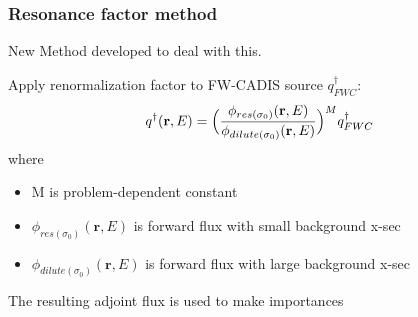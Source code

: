 \documentclass[xcolor=x11names,compress, handout]{beamer}
\renewcommand{\(}{\begin{columns}}
\renewcommand{\)}{\end{columns}}
\newcommand{\<}[1]{\begin{column}{#1}}
\renewcommand{\>}{\end{column}}
\newcommand{\ve}[1]{\ensuremath{\mathbf{#1}}}
\newcommand{\micro}{\ensuremath{\sigma}}
\begin{document}
\begin{frame}[fragile]
  \frametitle{Resonance factor method \cite{Wilson2015}}
  
  \alert{New Method} developed to deal with this. 
  \vspace{0.5 em}
  
  	Apply renormalization factor to FW-CADIS source $q^{\dagger}_{FWC}$: 
	\begin{equation}
   	q^{\dagger}(\ve{r},E) = \Bigl(\frac{\phi_{res(\micro_0)}(\ve{r},E)}{\phi_{dilute(\micro_0)}(\ve{r},E)}\Bigr)^M q^{\dagger}_{FWC}  \nonumber
  	 \label{eq:newQ}
	\end{equation}
	where
	\begin{itemize}
  	\item M is problem-dependent constant 
 	 \item $\phi_{res(\micro_0)}(\ve{r},E)$ is forward flux with small background x-sec
 	 \item $\phi_{dilute(\micro_0)}(\ve{r},E)$ is forward flux with large background x-sec
	\end{itemize}
	\pause
	\vspace*{1 em}
	The resulting adjoint flux is used to make importances
	
	
\end{frame}


%  
%	
%  
\end{document}
